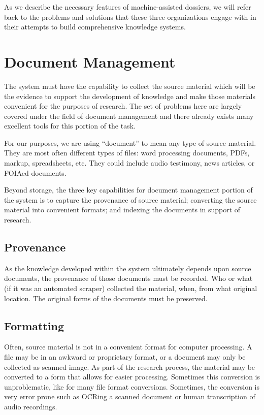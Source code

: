 \documentclass[format=siggraph, review=true]{acmart}
\begin{document}
As we describe the necessary features of machine-assisted dossiers, we will
refer back to the problems and solutions that these three organizations
engage with in their attempts to build comprehensive knowledge systems.

\section{Document Management}
The system must have the capability to collect the source material
which will be the evidence to support the development of
knowledge and make those materials convenient for the purposes of
research. The set of problems here are largely covered under the field
of document management and there already exists many excellent tools
for this portion of the task.

For our purposes, we are using ``document'' to mean any type of source
material. They are most often different types of files: word
processing documents, PDFs, markup, spreadsheets, etc. They could
include audio testimony, news articles, or FOIAed documents.

Beyond storage, the three key capabilities for document management
portion of the system is to capture the provenance of source material;
converting the source material into convenient formats; and indexing
the documents in support of research.

\subsection{Provenance}
As the knowledge developed within the system ultimately depends upon
source documents, the provenance of those documents must be
recorded. Who or what (if it was an automated scraper) collected the
material, when, from what original location. The original forms of the
documents must be preserved.

\subsection{Formatting}
Often, source material is not in a convenient format for computer
processing. A file may be in an awkward or proprietary format, or a
document may only be collected as scanned image. As part of the
research process, the material may be converted to a form that allows
for easier processing. Sometimes this conversion is unproblematic,
like for many file format conversions. Sometimes, the conversion is
very error prone such as OCRing a scanned document or human
transcription of audio recordings.
\end{document}
